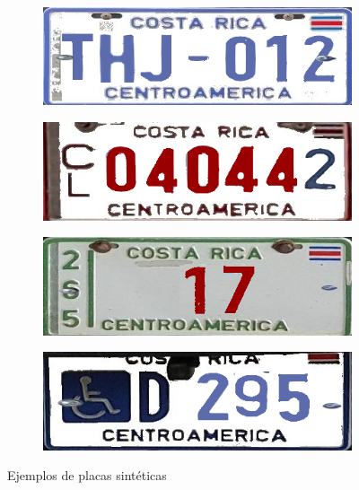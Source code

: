 \begin{figure}[H]
    \begin{subfigure}[t]{0.45\textwidth}
        \centering
        \includegraphics[width=\linewidth]{fig/proy/synthetic_plate_3.png}
    \end{subfigure}
	\hfill
    \begin{subfigure}[t]{0.45\textwidth}
        \centering
        \includegraphics[width=\linewidth]{fig/proy/synthetic_plate_4.png}
    \end{subfigure}
	
	\vspace{1em}

    \begin{subfigure}[t]{0.45\textwidth}
        \centering
        \includegraphics[width=\linewidth]{fig/proy/synthetic_plate_5.png}
    \end{subfigure}
	\hfill
    \begin{subfigure}[t]{0.45\textwidth}
        \centering
        \includegraphics[width=\linewidth]{fig/proy/synthetic_plate_6.png}
    \end{subfigure}
    \caption{Ejemplos de placas sintéticas}
	\label{fig:ejemplo-placas-sinteticas}
\end{figure}

